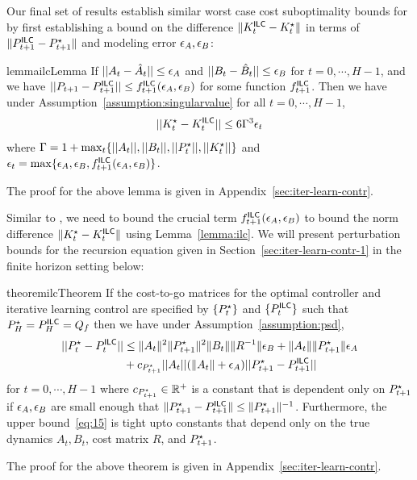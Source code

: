 Our final set of results establish similar worst case cost
suboptimality bounds for \ILC{} by first establishing a bound on the
difference $\|K^\mathsf{ILC}_t - K^\star_t\|$ in terms of $\|P^\mathsf{ILC}_{t+1} -
P^\star_{t+1}\|$ and modeling error $\epsilon_A, \epsilon_B$:
\begin{restatable}{lemma}{ilcLemma}
  \label{lemma:ilc}
  If $||A_{t} - \hat{A}_{t}|| \leq \epsilon_A$ and
  $||B_{t} - \hat{B}_{t}|| \leq \epsilon_B$ for $t=0, \cdots, H-1$, and we have
  $||P_{t+1} - P^\mathsf{ILC}_{t+1}|| \leq f^\mathsf{ILC}_{t+1}(\epsilon_A, \epsilon_B)$ for some function
  $f^\mathsf{ILC}_{t+1}$. Then we have under
  Assumption~\ref{assumption:singularvalue} for all $t=0, \cdots, H-1$,
  \begin{align}
    ||K^\star_{t} - K^\mathsf{ILC}_{t}|| \leq 6\Gamma^3\epsilon_t
    \label{eq:ilc-k-diff}
  \end{align}
  where
  $\Gamma = 1 + \max_{t}\{||A_{t}||, ||B_{t}||, ||P^\star_{t}||, ||K^\star_{t}||\}$
  and $\epsilon_{t} = \max\{\epsilon_A, \epsilon_B, f^\mathsf{ILC}_{t+1}(\epsilon_A,
  \epsilon_B)\}$. 
\end{restatable}
The proof for the above lemma is given in Appendix~\ref{sec:iter-learn-contr}.

Similar to \MM{}, we need to bound the crucial term
$f^\mathsf{ILC}_{t+1}(\epsilon_A, \epsilon_B)$ to bound the norm difference $\|K^\star_t -
K^\mathsf{ILC}_t\|$ using Lemma~\ref{lemma:ilc}. We will present perturbation
bounds for the \ILC{}
recursion equation given in 
Section~\ref{sec:iter-learn-contr-1} in the finite horizon setting
below:
\begin{restatable}{theorem}{ilcTheorem}
  \label{theorem:ilc}
  If the cost-to-go matrices for the optimal controller and iterative learning
  control are specified by $\{P^\star_{t}\}$ and $\{P^\mathsf{ILC}_{t}\}$ such
  that $P^\star_{H} = P^\mathsf{ILC}_{H} = Q_f$ then we have under
  Assumption~\ref{assumption:psd},
  \begin{align}
    \label{eq:15}
    ||P^\star_{t} - P^\mathsf{ILC}_{t}|| &\leq  \|A_{t}\|^{2}\|P^\star_{t+1}\|^{2}\|B_{t}\|\|R^{-1}\|\epsilon_B
    + \|A_{t}\|\|P^\star_{t+1}\|\epsilon_A \nonumber\\
                        &+ c_{P^\star_{t+1}}||A_{t}||(\|A_{t}\|+ \epsilon_A)||P^\star_{t+1} - P^\mathsf{ILC}_{{t+1}}||
  \end{align}
  for $t=0, \cdots, H-1$ where $c_{P^\star_{t+1}} \in \mathbb{R}^+$ is a
  constant that is dependent only on 
  $P^\star_{t+1}$ if $\epsilon_A, \epsilon_B$ are small enough that $\|P^\star_{t+1}
  - P^\mathsf{ILC}_{t+1}\| \leq \|P^\star_{t+1}\|^{-1}$. Furthermore, the upper bound~\eqref{eq:15} is tight
  upto constants that depend only on the true dynamics $A_t, B_t$,
  cost matrix $R$, and $P^\star_{t+1}$. 
\end{restatable}
The proof for the above theorem is given in Appendix~\ref{sec:iter-learn-contr}.

